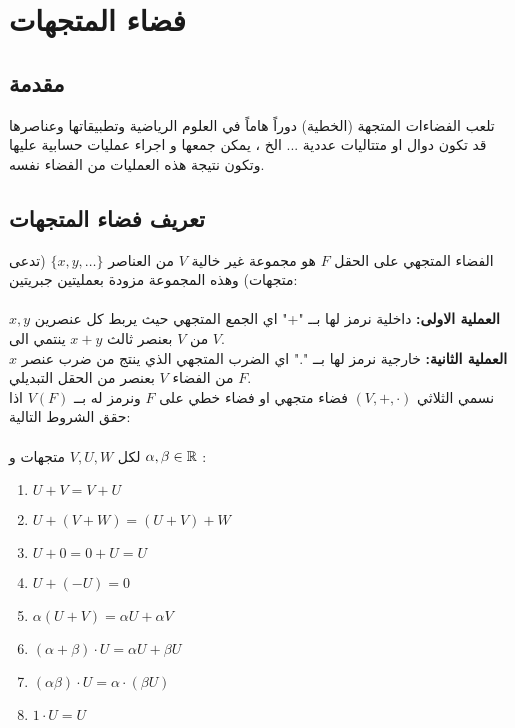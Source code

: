 \chapter{فضاء المتجهات}

\section*{مقدمة}
تلعب الفضاءات المتجهة (الخطية) دوراً هاماً في العلوم الرياضية وتطبيقاتها وعناصرها قد تكون دوال او متتاليات عددية ... الخ ، يمكن جمعها و اجراء عمليات حسابية عليها وتكون نتيجة هذه العمليات من الفضاء نفسه.

\section[تعريف فضاء المتجهات]{تعريف فضاء المتجهات \cite{key1}}
الفضاء المتجهي على الحقل $F$ هو مجموعة غير خالية $V$ من العناصر $\{x, y, \dots\}$ (تدعى متجهات) وهذه المجموعة مزودة بعمليتين جبريتين:\\ \\
\noindent
\textbf{العملية الاولى:} داخلية نرمز لها بــ "+" اي الجمع المتجهي حيث يربط كل عنصرين $x, y$ من $V$ بعنصر ثالث $x+y$ ينتمي الى $V$.\\
\noindent
\textbf{العملية الثانية:} خارجية نرمز لها بــ "." اي الضرب المتجهي الذي ينتج من ضرب عنصر $x$ من الفضاء $V$ بعنصر من الحقل التبديلي $F$.\\
\noindent
نسمي الثلاثي $(V, +, \cdot)$ فضاء متجهي او فضاء خطي على $F$ ونرمز له بــ $V(F)$ اذا حقق الشروط التالية:\\ \\
\noindent
لكل $V, U, W$ متجهات و $\alpha, \beta \in \mathbb{R}$  :
\begin{english}
	\begin{enumerate}
	\item $U+V = V+U$
	\item $U+(V+W) = (U+V)+W$
	\item $U+0=0+U=U$
	\item $U+(-U) = 0$
	\item $\alpha(U+V) = \alpha U + \alpha V$
	\item $(\alpha+\beta)\cdot U = \alpha U + \beta U$
	\item $(\alpha\beta)\cdot U = \alpha\cdot (\beta U)$
	\item $1\cdot U = U$
\end{enumerate}
\end{english}
\newpage
